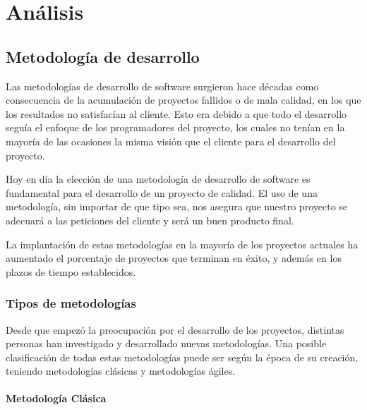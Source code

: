\chapter{Análisis}


\section{Metodología de desarrollo}

Las metodologías de desarrollo de software surgieron hace décadas como consecuencia de la acumulación de proyectos fallidos o de mala calidad, en los que los resultados no satisfacían al cliente. Esto era debido a que todo el desarrollo seguía el enfoque de los programadores del proyecto, los cuales no tenían en la mayoría de las ocasiones la misma visión que el cliente para el desarrollo del proyecto.

Hoy en día la elección de una metodología de desarrollo de software es fundamental para el desarrollo de un proyecto de calidad. El uso de una metodología, sin importar de que tipo sea, nos asegura que nuestro proyecto se adecuará a las peticiones del cliente y será un buen producto final.

La implantación de estas metodologías en la mayoría de los proyectos actuales ha aumentado el porcentaje de proyectos que terminan en éxito, y además en los plazos de tiempo establecidos.

\subsection{Tipos de metodologías}

Desde que empezó la preocupación por el desarrollo de los proyectos, distintas personas han investigado y desarrollado nuevas metodologías. Una posible clasificación de todas estas metodologías puede ser según la época de su creación, teniendo metodologías clásicas y metodologías ágiles.

\subsubsection{Metodología Clásica}

